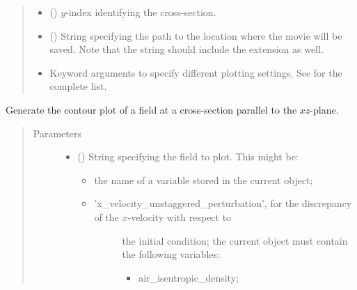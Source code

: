 \documentclass[letterpaper,10pt,english]{sphinxmanual}
\begin{document}
\begin{fulllineitems}
\begin{fulllineitems}
\begin{quote}
\begin{description}
\begin{itemize}
\begin{itemize}
\end{itemize}


\item {} 
 () \textendash{} \(y\)-index identifying the cross-section.

\item {} 
 () \textendash{} String specifying the path to the location where the movie will be saved.
Note that the string should include the extension as well.

\item {} 
 \textendash{} Keyword arguments to specify different plotting settings.
See {\hyperref[\detokenize{api:tasmania.utils.utils_plot.animation_contourf_xz}]{}} for the complete list.

\end{itemize}

\end{description}\end{quote}

\end{fulllineitems}


\begin{fulllineitems}
\label{\detokenize{api:storages.state_isentropic.StateIsentropic.contour_xz}}
Generate the contour plot of a field at a cross-section parallel to the \(xz\)-plane.
\begin{quote}\begin{description}
\item[{Parameters}] \leavevmode\begin{itemize}
\item {} 
 () \textendash{} 
String specifying the field to plot. This might be:
\begin{itemize}
\item {} 
the name of a variable stored in the current object;

\item {} \begin{description}
\item[{’x\_velocity\_unstaggered\_perturbation’, for the discrepancy of the \(x\)-velocity with respect to}] \leavevmode
the initial condition; the current object must contain the following variables:
\begin{itemize}
\item {} 
air\_isentropic\_density;


\end{itemize}
\end{description}
\end{itemize}
\end{itemize}
\end{description}
\end{quote}
\end{fulllineitems}
\end{fulllineitems}
\end{document}
